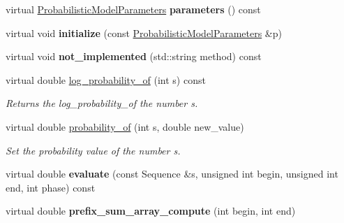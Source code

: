 \begin{DoxyCompactItemize}
\mbox{\label{classtops_1_1ProbabilisticModel_aeead765622ab52ff8069ebe0a7a8ee4d}} 
virtual \hyperlink{classtops_1_1ProbabilisticModelParameters}{Probabilistic\+Model\+Parameters} {\bfseries parameters} () const
\item 
\mbox{\label{classtops_1_1ProbabilisticModel_a0e61b57a8890bec9fdb99e9393485eec}} 
virtual void {\bfseries initialize} (const \hyperlink{classtops_1_1ProbabilisticModelParameters}{Probabilistic\+Model\+Parameters} \&p)
\item 
\mbox{\label{classtops_1_1ProbabilisticModel_a4e1f5d3498629ab59c91731680118b85}} 
virtual void {\bfseries not\+\_\+implemented} (std\+::string method) const
\item 
\mbox{\label{classtops_1_1ProbabilisticModel_abf2ca201c9bf0ba9987c831636014774}} 
virtual double \hyperlink{classtops_1_1ProbabilisticModel_abf2ca201c9bf0ba9987c831636014774}{log\+\_\+probability\+\_\+of} (int s) const
\begin{DoxyCompactList}\small\item\em Returns the log\+\_\+probability\+\_\+of the number s. \end{DoxyCompactList}\item 
\mbox{\label{classtops_1_1ProbabilisticModel_ae584dc413f9494f50e00ffcbbbe75296}} 
virtual double \hyperlink{classtops_1_1ProbabilisticModel_ae584dc413f9494f50e00ffcbbbe75296}{probability\+\_\+of} (int s, double new\+\_\+value)
\begin{DoxyCompactList}\small\item\em Set the probability value of the number s. \end{DoxyCompactList}\item 
\mbox{\label{classtops_1_1ProbabilisticModel_aebaa3ff8a48e983b479fcb00a6b1397b}} 
virtual double {\bfseries evaluate} (const Sequence \&s, unsigned int begin, unsigned int end, int phase) const
\item 
\mbox{\label{classtops_1_1ProbabilisticModel_a8af04b27c44db7c0094cbd9c07a0b899}} 
virtual double {\bfseries prefix\+\_\+sum\+\_\+array\+\_\+compute} (int begin, int end)

\end{DoxyCompactItemize}
